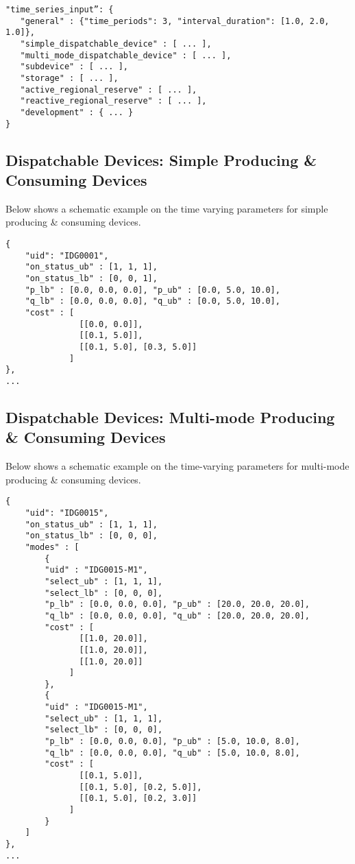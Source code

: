 \begin{verbatim}
"time_series_input”: {
   "general" : {"time_periods": 3, "interval_duration": [1.0, 2.0, 1.0]},   
   "simple_dispatchable_device" : [ ... ],
   "multi_mode_dispatchable_device" : [ ... ],
   "subdevice" : [ ... ],
   "storage" : [ ... ],
   "active_regional_reserve" : [ ... ],
   "reactive_regional_reserve" : [ ... ],
   "development" : { ... }
}    
\end{verbatim}


\subsection{Dispatchable Devices: Simple Producing \& Consuming Devices}
\label{sec:generator_time}
Below shows a schematic example on the time varying parameters for simple producing \& consuming devices.
\begin{verbatim}
{
    "uid": "IDG0001",
    "on_status_ub" : [1, 1, 1],
    "on_status_lb" : [0, 0, 1],
    "p_lb" : [0.0, 0.0, 0.0], "p_ub" : [0.0, 5.0, 10.0],
    "q_lb" : [0.0, 0.0, 0.0], "q_ub" : [0.0, 5.0, 10.0],
    "cost" : [ 
               [[0.0, 0.0]],
               [[0.1, 5.0]],
               [[0.1, 5.0], [0.3, 5.0]] 
             ]
}, 
... 
\end{verbatim}

\subsection{Dispatchable Devices: Multi-mode Producing \& Consuming Devices}
\label{sec:multi-generator_time}
Below shows a schematic example on the time-varying parameters for multi-mode producing \& consuming devices.
\begin{verbatim}
{
    "uid": "IDG0015",
    "on_status_ub" : [1, 1, 1],
    "on_status_lb" : [0, 0, 0],
    "modes" : [
        {
        "uid" : "IDG0015-M1",
        "select_ub" : [1, 1, 1],
        "select_lb" : [0, 0, 0],
        "p_lb" : [0.0, 0.0, 0.0], "p_ub" : [20.0, 20.0, 20.0],
        "q_lb" : [0.0, 0.0, 0.0], "q_ub" : [20.0, 20.0, 20.0],
        "cost" : [ 
               [[1.0, 20.0]],
               [[1.0, 20.0]],
               [[1.0, 20.0]] 
             ]    
        },
        {
        "uid" : "IDG0015-M1",
        "select_ub" : [1, 1, 1],
        "select_lb" : [0, 0, 0],
        "p_lb" : [0.0, 0.0, 0.0], "p_ub" : [5.0, 10.0, 8.0],
        "q_lb" : [0.0, 0.0, 0.0], "q_ub" : [5.0, 10.0, 8.0],
        "cost" : [ 
               [[0.1, 5.0]],
               [[0.1, 5.0], [0.2, 5.0]],
               [[0.1, 5.0], [0.2, 3.0]] 
             ]    
        }    
    ] 
}, 
... 
\end{verbatim}

